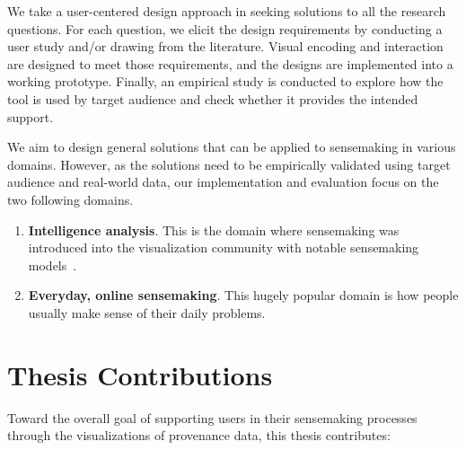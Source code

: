 
We take a user-centered design approach in seeking solutions to all the research questions. For each question, we elicit the design requirements by conducting a user study and/or drawing from the literature. Visual encoding and interaction are designed to meet those requirements, and the designs are implemented into a working prototype. Finally, an empirical study is conducted to explore how the tool is used by target audience and check whether it provides the intended support. 

We aim to design general solutions that can be applied to sensemaking in various domains. However, as the solutions need to be empirically validated using target audience and real-world data, our implementation and evaluation focus on the two following domains. 

\begin{enumerate}
	\item \textbf{Intelligence analysis}. This is the domain where sensemaking was introduced into the visualization community with notable sensemaking models~\cite{Klein2003, Pirolli2005}.
	\item \textbf{Everyday, online sensemaking}. This hugely popular domain is how people usually make sense of their daily problems.
\end{enumerate}

\section{Thesis Contributions}
Toward the overall goal of supporting users in their sensemaking processes through the visualizations of provenance data, this thesis contributes:

